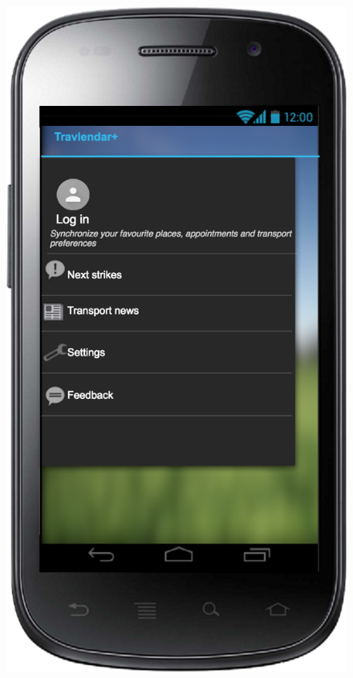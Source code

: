 \documentclass[a4paper,leqno]{article}
\begin{document}
\begin{figure}
\vspace{3.5 cm}

\begin{minipage}[!h]{0.45\linewidth}
	\centering
	\includegraphics[scale = 0.15]{Menu.png}
\end{minipage}

\end{figure}
\end{document}
